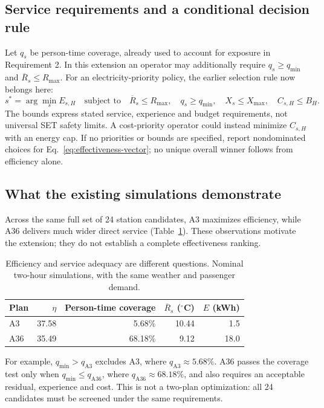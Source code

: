 \subsection{Service requirements and a conditional decision rule}

Let $q_s$ be person-time coverage, already used to account for exposure in Requirement 2. In this extension an operator may additionally require $q_s\ge q_{\min}$ and $\overline R_s\le R_{\max}$. For an electricity-priority policy, the earlier selection rule now belongs here:
\begin{equation}
 s^*=\arg\min_s E_{s,H}\quad\text{subject to}\quad
 \overline R_s\le R_{\max},\quad q_s\ge q_{\min},\quad
 X_s\le X_{\max},\quad C_{s,H}\le B_H.
\label{eq:effectiveness-selection}
\end{equation}
The bounds express stated service, experience and budget requirements, not universal SET safety limits. A cost-priority operator could instead minimize $C_{s,H}$ with an energy cap. If no priorities or bounds are specified, report nondominated choices for Eq.~\eqref{eq:effectiveness-vector}; no unique overall winner follows from efficiency alone.

\subsection{What the existing simulations demonstrate}

Across the same full set of 24 station candidates, A3 maximizes efficiency, while A36 delivers much wider direct service (Table~\ref{tab:efficiency-effectiveness}). These observations motivate the extension; they do not establish a complete effectiveness ranking.

\begin{table}[!ht]
\centering\small
\caption{Efficiency and service adequacy are different questions. Nominal two-hour simulations, with the same weather and passenger demand.}
\label{tab:efficiency-effectiveness}
\begin{tabular}{@{}lrrrr@{}}
\toprule
Plan & $\eta$ & Person-time coverage & $\overline R_s$ ($^{\circ}$C) & $E$ (kWh)\\
\midrule
A3 & 37.58 & 5.68\% & 10.44 & 1.5\\
A36 & 35.49 & 68.18\% & 9.12 & 18.0\\
\bottomrule
\end{tabular}
\end{table}

For example, $q_{\min}>q_{\mathrm{A3}}$ excludes A3, where $q_{\mathrm{A3}}\approx5.68\%$. A36 passes the coverage test only when $q_{\min}\le q_{\mathrm{A36}}$, where $q_{\mathrm{A36}}\approx68.18\%$, and also requires an acceptable residual, experience and cost. This is not a two-plan optimization: all 24 candidates must be screened under the same requirements.

